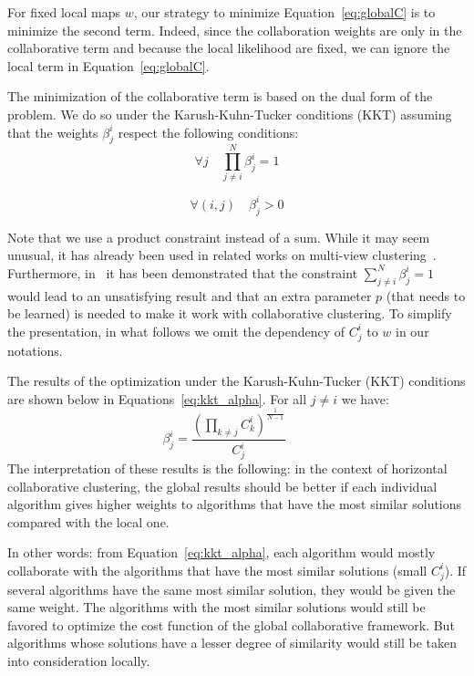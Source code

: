 For fixed local maps $w$, our strategy to minimize Equation~\eqref{eq:globalC} is to minimize the second term. Indeed, since the collaboration weights are only in the collaborative term and because the local likelihood are fixed, we can ignore the local term in Equation~\eqref{eq:globalC}.

The minimization of the collaborative term is based on the dual form of the problem. We do so under the Karush-Kuhn-Tucker conditions (KKT) 
\cite{KKT1} assuming that the weights $\beta_j^i$ respect the following conditions:
$$\forall j \quad \prod_{j \neq i}^N \beta_j^i = 1$$ 

$$\forall (i,j) \quad \beta_j^i >0 $$ 

Note that we use a product constraint instead of a sum. While it may seem unusual, it has already been used in related works on multi-view clustering~\cite{CarvalhoML15}. Furthermore, in~\cite{Sublime2017} it has been demonstrated that the constraint $\sum_{j \neq i}^N \beta_j^i = 1$ would lead to an unsatisfying result and that an extra parameter $p$ (that needs to be learned) is needed to make it work with collaborative clustering. To simplify the presentation, in what follows we omit the dependency of $C_j^i$ to $w$ in our notations.


The results of the optimization under the Karush-Kuhn-Tucker (KKT) conditions are shown below  in Equations~\eqref{eq:kkt_alpha}. For  all  $ j \neq i$  
we have:
\begin{equation}
\beta_j^i =  \frac{{(\prod_{k\neq j} C_k^i)}^{\frac 1 {N-1}}} {C_j^i} \qquad
\label{eq:kkt_alpha}
\end{equation} 
The interpretation of these results is the following: 
in the context of horizontal collaborative clustering, the global results should be better if each individual algorithm gives higher weights to algorithms that have the most similar solutions compared with the local one.

In other words: from Equation~\eqref{eq:kkt_alpha}, each algorithm would mostly collaborate with the algorithms that have the most similar solutions (small $C_j^i$). If several algorithms have the same most similar solution, they would be given the same weight.  The algorithms with the most similar solutions would still be favored to optimize the cost function of the global collaborative framework. But algorithms whose solutions have a lesser degree of similarity would still be taken into consideration locally. 

